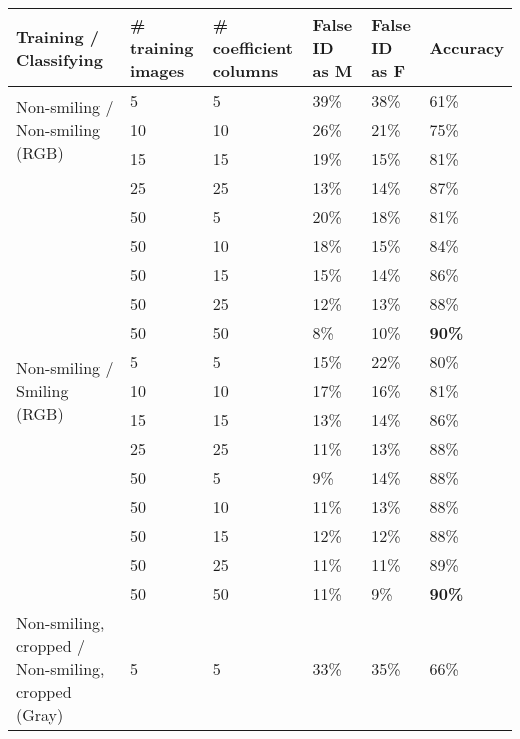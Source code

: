 \documentclass[hidelinks,11pt]{article}
\begin{document}
\begin{appendices}
  \begin{longtable}{p{6em} p{5em} p{6em} p{6em} p{6em} p{6em}}
      \toprule
      Training / Classifying & \# training images  & \# coefficient columns  & False ID as M & False
      ID as F & Accuracy \\
      \midrule
      \midrule
      \multirow{3}{6em}{Non-smiling / Non-smiling (RGB)} 
                                & 5   & 5   & 39\%  & 38\%  & 61\% \\
                                & 10  & 10  & 26\%  & 21\%  & 75\% \\
                                & 15  & 15  & 19\%  & 15\%  & 81\% \\
                                & 25  & 25  & 13\%  & 14\%  & 87\% \\
                                & 50  & 5   & 20\%  & 18\%  & 81\% \\
                                & 50  & 10  & 18\%  & 15\%  & 84\% \\
                                & 50  & 15  & 15\%  & 14\%  & 86\% \\
                                & 50  & 25  & 12\%  & 13\%  & 88\% \\
                                & 50  & 50  & 8\%   & 10\%  & \bfseries 90\% \\
      \midrule
      \multirow{3}{6em}{Non-smiling / Smiling (RGB)} 
                                & 5   & 5   & 15\%  & 22\%  & 80\% \\
                                & 10  & 10  & 17\%  & 16\%  & 81\% \\
                                & 15  & 15  & 13\%  & 14\%  & 86\% \\
                                & 25  & 25  & 11\%  & 13\%  & 88\% \\
                                & 50  & 5   & 9\%   & 14\%  & 88\% \\
                                & 50  & 10  & 11\%  & 13\%  & 88\% \\
                                & 50  & 15  & 12\%  & 12\%  & 88\% \\
                                & 50  & 25  & 11\%  & 11\%  & 89\% \\
                                & 50  & 50  & 11\%  & 9\%   & \bfseries 90\% \\
      \midrule
      \multirow{3}{6em}{Non-smiling, cropped / Non-smiling, cropped (Gray)} 
                                & 5   & 5   & 33\%  & 35\%  & 66\% \\

\end{longtable}
\end{appendices}
\end{document}
